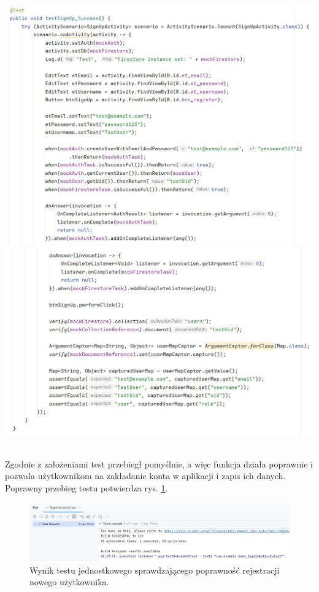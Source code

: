 \noindent
\begin{minipage}{\linewidth}
    \label{test:signup}
    \centering
    \includegraphics[width=0.8\linewidth]{img/test/test-signup1.jpg}
    \includegraphics[width=0.8\linewidth]{img/test/test-signup2.jpg}
\end{minipage}
\\


Zgodnie z założeniami test przebiegł pomyślnie, a więc funkcja działa poprawnie i pozwala użytkownikom na zakładanie konta w aplikacji i zapis ich danych. Poprawny przebieg testu potwierdza rys. \ref{result:login}. \\
\begin{figure}[H]
    \centering
    \includegraphics[scale=0.5]{img/test/login-wynik.jpg}
    \caption{Wynik testu jednostkowego sprawdzającego poprawność rejestracji nowego użytkownika.}
    \label{result:login}
\end{figure}

